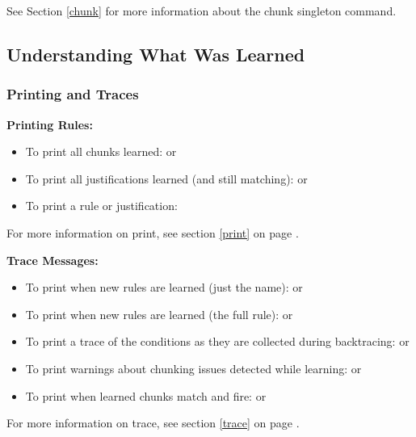 See Section \ref{chunk} for more information about the chunk singleton command.

\subsection{Understanding What Was Learned}

\subsubsection{Printing and Traces}

\textbf{Printing Rules:}
\begin{itemize}
	\item To print all chunks learned: \newline  {} or 
	\item To print all justifications learned (and still matching):  \newline {} or 
	\item To print a rule or justification: \newline  {}
\end{itemize}

For more information on print, see section \ref{print} on page \pageref{print}.

\textbf{Trace Messages:}
\begin{itemize}
	\item To print when new rules are learned (just the name): \newline {} or   
	\item To print when new rules are learned (the full rule): \newline {} or   
	\item To print a trace of the conditions as they are collected during backtracing: \newline {} or   
	\item To print warnings about chunking issues detected while learning:  \newline {} or 
	\item To print when learned chunks match and fire: \newline  {} or   
\end{itemize}
For more information on trace, see section \ref{trace} on page \pageref{trace}.

